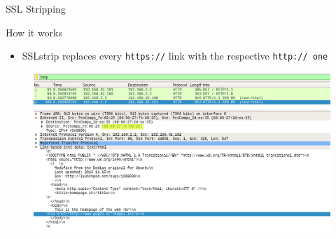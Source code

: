 \documentclass{beamer}
\begin{document}
\begin{frame}{SSL Stripping}
  \begin{block}{How it works}
    \begin{itemize}
      \item SSLstrip replaces every \texttt{https://} link with the respective \texttt{http:// one}
    \end{itemize}
  \end{block}
  \begin{figure}
    \includegraphics[width=\textwidth]{../figures/sslstrip_http}
    \caption*{}
  \end{figure}
\end{frame}
\end{document}
